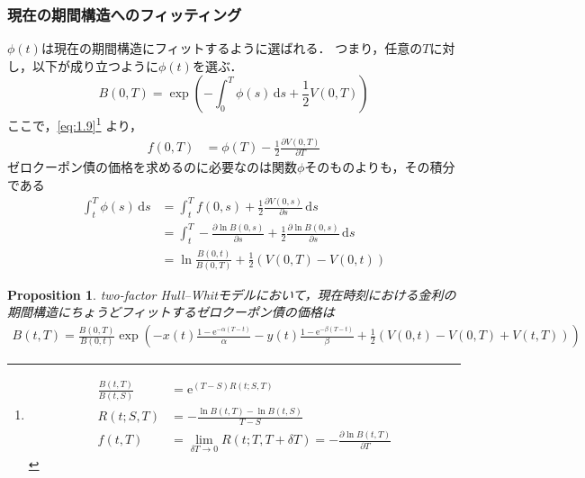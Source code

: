 \documentclass[a4paper, lualatex, ja=standard]{bxjsarticle}
\theoremstyle{theorem}
\newtheorem{prop}[thm]{Proposition}
\theoremstyle{definition}
\theoremstyle{definition}
\newcommand{\diff}{\mathrm{d}}
\begin{document}
\subsubsection*{現在の期間構造へのフィッティング}
\setcounter{equation}{40}
$\phi(t)$は現在の期間構造にフィットするように選ばれる．
つまり，任意の$T$に対し，以下が成り立つように$\phi(t)$を選ぶ．
\begin{equation*}
  B(0,T) = \exp\left(-\int_0^T \phi(s)\,\diff s + \frac{1}{2}V(0,T)\right)
\end{equation*}
ここで，\eqref{eq:1.9}\footnote{
  \begin{align*}
    \frac{B(t,T)}{B(t,S)} &= \mathrm{e}^{(T-S)R(t;S,T)} \\
    R(t;S,T) &= -\frac{\ln{B(t,T)}-\ln{B(t,S)}}{T-S} \\
    f(t,T) &= \lim_{\delta T\to0} R(t;T,T+\delta T) = -\frac{\partial\ln{B(t,T)}}{\partial T} \tag{1.9} \label{eq:1.9}
  \end{align*}
}
より，
\begin{align}
  f(0,T) &= \phi(T)  - \frac{1}{2}\frac{\partial V(0,T)}{\partial T} 
\end{align}
ゼロクーポン債の価格を求めるのに必要なのは関数$\phi$そのものよりも，その積分である
\begin{align*}
  \int_t^T \phi(s)\,\diff s &= \int_t^T f(0,s) + \frac{1}{2}\frac{\partial V(0,s)}{\partial s} \,\diff s \\
  &= \int_t^T -\frac{\partial \ln{B(0,s)}}{\partial s} + \frac{1}{2}\frac{\partial \ln{B(0,s)}}{\partial s} \,\diff s \\
  &= \ln\frac{B(0,t)}{B(0,T)} + \frac{1}{2}(V(0,T)-V(0,t))
\end{align*}

\begin{prop}
  two-factor Hull--Whitモデルにおいて，現在時刻における金利の期間構造にちょうどフィットするゼロクーポン債の価格は
  \begin{equation}
    \begin{aligned}
      B(t, T)=\frac{B(0, T)}{B(0, t)} \exp \left(  -x(t) \frac{1-\mathrm{e}^{-\alpha(T-t)}}{\alpha}-y(t) \frac{1-\mathrm{e}^{-\beta(T-t)}}{\beta}+\frac{1}{2}(V(0, t)-V(0, T)+V(t, T))\right)\label{eq:3.42}
      \end{aligned}
  \end{equation}
\end{prop}
\end{document}
